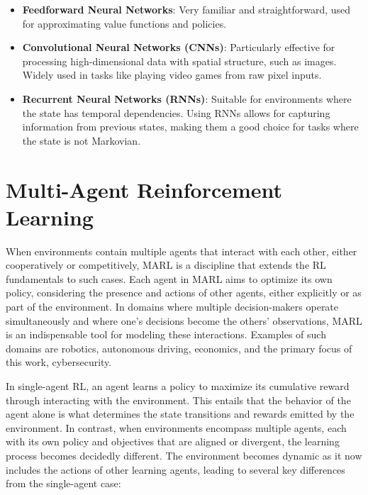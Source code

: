 \begin{itemize}
    \item \textbf{Feedforward Neural Networks}: Very familiar and straightforward, used for approximating value functions and policies.
    \item \textbf{Convolutional Neural Networks (CNNs)}: Particularly effective for processing high-dimensional data with spatial structure, such as images. Widely used in tasks like playing video games from raw pixel inputs.
    \item \textbf{Recurrent Neural Networks (RNNs)}: Suitable for environments where the state has temporal dependencies. Using RNNs allows for capturing information from previous states, making them a good choice for tasks where the state is not Markovian.
\end{itemize}

\section{Multi-Agent Reinforcement Learning}

When environments contain multiple agents that interact with each other, either cooperatively or competitively, \gls{MARL} is a discipline that extends the \gls{RL} fundamentals to such cases.
Each agent in \gls{MARL} aims to optimize its own policy, considering the presence and actions of other agents, either explicitly or as part of the environment.
In domains where multiple decision-makers operate simultaneously and where one's decisions become the others' observations, \gls{MARL} is an indispensable tool for modeling these interactions.
Examples of such domains are robotics, autonomous driving, economics, and the primary focus of this work, cybersecurity.

In single-agent \gls{RL}, an agent learns a policy to maximize its cumulative reward through interacting with the environment.
This entails that the behavior of the agent alone is what determines the state transitions and rewards emitted by the environment.
In contrast, when environments encompass multiple agents, each with its own policy and objectives that are aligned or divergent, the learning process becomes decidedly different.
The environment becomes dynamic as it now includes the actions of other learning agents, leading to several key differences from the single-agent case:

